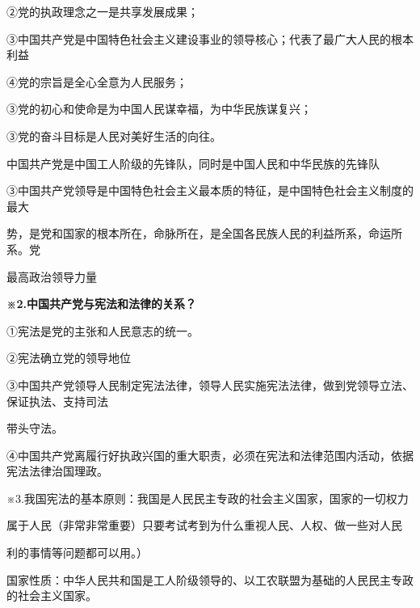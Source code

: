 \documentclass[lang=cn,11pt]{elegantbook}
\newcommand{\daofasym}[1]{{\daofasymbolfont #1}}
\newcommand{\daofasym}[1]{#1}
\begin{document}
\daofasym{②}党的执政理念之一是共享发展成果；\par

\daofasym{③}中国共产党是中国特色社会主义建设事业的领导核心；代表了最广大人民的根本利益\par

\daofasym{④}党的宗旨是全心全意为人民服务；\par

\daofasym{③}党的初心和使命是为中国人民谋幸福，为中华民族谋复兴；\par

\daofasym{③}党的奋斗目标是人民对美好生活的向往。\par

中国共产党是中国工人阶级的先锋队，同时是中国人民和中华民族的先锋队\par

\daofasym{③}中国共产党领导是中国特色社会主义最本质的特征，是中国特色社会主义制度的最大\par

势，是党和国家的根本所在，命脉所在，是全国各民族人民的利益所系，命运所系。党\par

最高政治领导力量\par

\textbf{※2.中国共产党与宪法和法律的关系？}\par

\daofasym{①}宪法是党的主张和人民意志的统一。\par

\daofasym{②}宪法确立党的领导地位\par

\daofasym{③}中国共产党领导人民制定宪法法律，领导人民实施宪法法律，做到党领导立法、保证执法、支持司法\par

带头守法。\par

\daofasym{④}中国共产党离履行好执政兴国的重大职责，必须在宪法和法律范围内活动，依据宪法法律治国理政。\par

※3.我国宪法的基本原则：我国是人民民主专政的社会主义国家，国家的一切权力\par

属于人民（非常非常重要）只要考试考到为什么重视人民、人权、做一些对人民\par

利的事情等问题都可以用。）\par

国家性质：中华人民共和国是工人阶级领导的、以工农联盟为基础的人民民主专政的社会主义国家。\par
\end{document}
